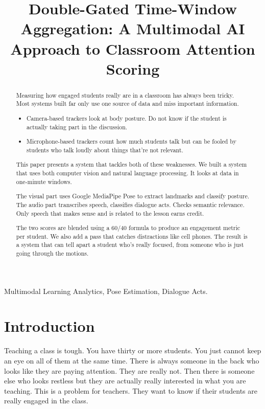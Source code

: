 \documentclass[conference]{IEEEtran}
\begin{document}
\title{Double-Gated Time-Window Aggregation: A Multimodal AI Approach to Classroom Attention Scoring}
\author{
}
\maketitle
\begin{abstract}
Measuring how engaged students really are in a classroom has always been tricky. Most systems built far only use one source of data and miss important information.
\begin{itemize}
    \item Camera-based trackers look at body posture. Do not know if the student is actually taking part in the discussion.
    \item Microphone-based trackers count how much students talk but can be fooled by students who talk loudly about things that're not relevant.
\end{itemize}
This paper presents a system that tackles both of these weaknesses. We built a system that uses both computer vision and natural language processing. It looks at data in one-minute windows.

The visual part uses Google MediaPipe Pose to extract landmarks and classify posture. The audio part transcribes speech, classifies dialogue acts. Checks semantic relevance. Only speech that makes sense and is related to the lesson earns credit.

The two scores are blended using a 60/40 formula to produce an engagement metric per student. We also add a pass that catches distractions like cell phones. The result is a system that can tell apart a student who's really focused, from someone who is just going through the motions.
\end{abstract}
\begin{IEEEkeywords}
Multimodal Learning Analytics, Pose Estimation, Dialogue Acts.
\end{IEEEkeywords}
\section{Introduction}
Teaching a class is tough. You have thirty or more students. You just cannot keep an eye on all of them at the same time. There is always someone in the back who looks like they are paying attention. They are really not. Then there is someone else who looks restless but they are actually really interested in what you are teaching. This is a problem for teachers. They want to know if their students are really engaged in the class.
\end{document}
